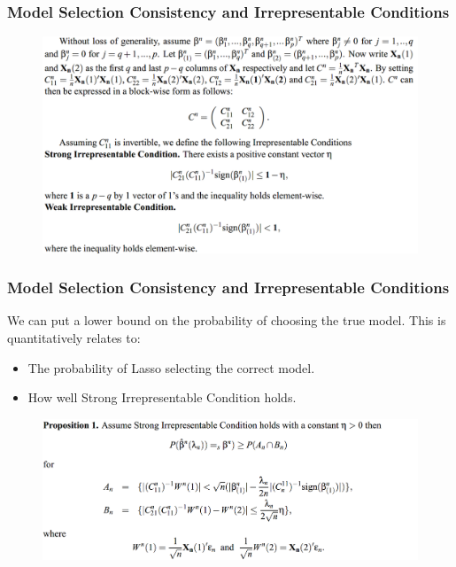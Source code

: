 \documentclass{beamer}
\begin{document}
	\begin{frame}
		\frametitle{Model Selection Consistency and Irrepresentable Conditions}
		\begin{figure}
			\includegraphics[width=1\linewidth]{image004.png}
		\end{figure}
	\end{frame}
	
	\begin{frame}
		\frametitle{Model Selection Consistency and Irrepresentable Conditions}
		We can put a lower bound on the probability of choosing the true model. This is quantitatively relates to:
		\begin{itemize}
			\item 
			The probability of Lasso selecting the correct model.
			\item
			How well Strong Irrepresentable Condition holds.
		\end{itemize}
		 \begin{figure}
		 	\includegraphics[width=1\linewidth]{image005.png}
		 \end{figure}
	\end{frame}
	
\end{document}
